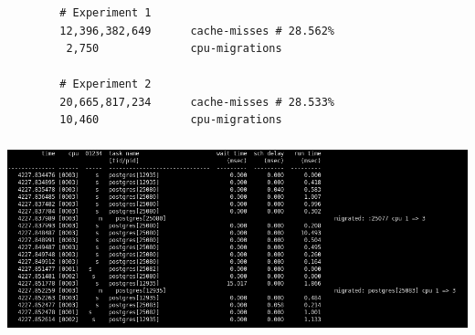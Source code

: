 \documentclass[usenames,dvipsnames, 18pt, compress, aspectratio=169]{beamer}
\begin{document}
\begin{frame}[fragile]{}
    \frametitle{}
    \begin{center}

        \begin{verbatim}
        # Experiment 1
        12,396,382,649      cache-misses # 28.562%
         2,750              cpu-migrations

        # Experiment 2
        20,665,817,234      cache-misses # 28.533%
        10,460              cpu-migrations
        \end{verbatim}

    \end{center}
\end{frame}

\begin{frame}
    \frametitle{}
    \begin{center}

        \includegraphics[width=1.0\textwidth,center]{migrations.png}

    \end{center}
\end{frame}
\end{document}
